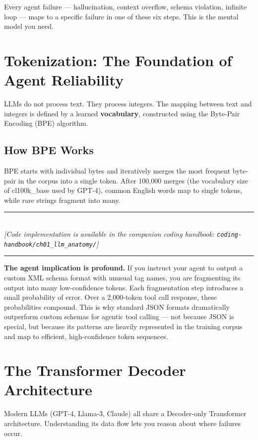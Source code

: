 Every agent failure — hallucination, context overflow, schema violation, infinite loop — maps to a specific failure in one of these six steps. This is the mental model you need.

\section{Tokenization: The Foundation of Agent Reliability}

LLMs do not process text. They process integers. The mapping between text and integers is defined by a learned \textbf{vocabulary}, constructed using the Byte-Pair Encoding (BPE) algorithm.

\subsection{How BPE Works}
BPE starts with individual bytes and iteratively merges the most frequent byte-pair in the corpus into a single token. After 100,000 merges (the vocabulary size of cl100k\_base used by GPT-4), common English words map to single tokens, while rare strings fragment into many.


\begin{center}
\noindent\rule{0.6\textwidth}{0.4pt} \\
\vspace{0.3em}
\textit{[Code implementation is available in the companion coding handbook: \texttt{coding-handbook/ch01\_llm\_anatomy/}]} \\
\noindent\rule{0.6\textwidth}{0.4pt}
\end{center}


\textbf{The agent implication is profound.} If you instruct your agent to output a custom XML schema format with unusual tag names, you are fragmenting its output into many low-confidence tokens. Each fragmentation step introduces a small probability of error. Over a 2,000-token tool call response, these probabilities compound. This is why standard JSON formats dramatically outperform custom schemas for agentic tool calling — not because JSON is special, but because its patterns are heavily represented in the training corpus and map to efficient, high-confidence token sequences.

\section{The Transformer Decoder Architecture}

Modern LLMs (GPT-4, Llama-3, Claude) all share a Decoder-only Transformer architecture. Understanding its data flow lets you reason about where failures occur.

